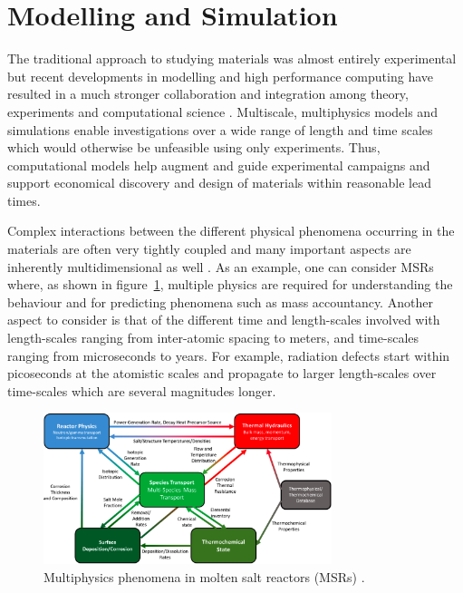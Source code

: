 \section{Modelling and Simulation}
	The traditional approach to studying materials was almost entirely experimental but recent developments in modelling and high performance computing have resulted in a much stronger collaboration and integration among theory, experiments and computational science \cite{STAN200920}. Multiscale, multiphysics models and simulations enable investigations over a wide range of length and time scales which would otherwise be unfeasible using only experiments. Thus, computational models help augment and guide experimental campaigns and support economical discovery and design of materials within reasonable lead times.

	Complex interactions between the different physical phenomena occurring in the materials are often very tightly coupled and many important aspects are inherently multidimensional  as well \cite{WILLIAMSON2012149}. As an example, one can consider MSRs where, as shown in figure~\ref{fig:msr_mf}, multiple physics  are required for understanding the behaviour and for predicting phenomena such as mass accountancy. Another aspect to consider is that of the different time and length-scales involved with length-scales ranging from inter-atomic spacing to meters, and time-scales ranging from microseconds to years. For example, radiation defects start within picoseconds at the atomistic scales and propagate to larger length-scales over time-scales which are several magnitudes longer.
	\begin{figure}[htb]
		\centering
		\includegraphics[width=0.75\textwidth]{figures/chapter-1/MSR_MP}
		\caption[Multiphysics phenomena in molten salt reactors (MSRs).]{Multiphysics phenomena in molten salt reactors (MSRs) \cite{McMurray:2021aa}.}
		\label{fig:msr_mf}
	\end{figure}
	

